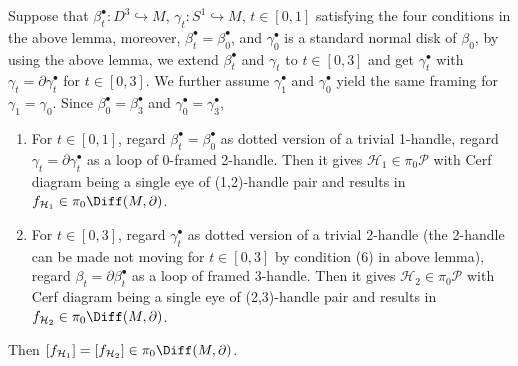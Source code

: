\begin{proposition} \label{prop:one-parameter-version}
    Suppose that $\beta_t^\bullet: D^3\hookrightarrow M$, $\gamma_t: S^1\hookrightarrow M$, $t\in [0,1]$ satisfying the four conditions in the above lemma, moreover, $\beta_t^\bullet=\beta_0^\bullet$, and $\gamma_0^\bullet$ is a standard normal disk of $\beta_0$, by using the above lemma, we extend $\beta_t^\bullet$ and $\gamma_t$ to $t\in[0,3]$ and get $\gamma_t^\bullet$ with $\gamma_t=\partial \gamma_t^\bullet$ for $t\in[0,3]$. We further assume $\gamma_1^\bullet$ and $\gamma_0^\bullet$ yield the same framing for $\gamma_1=\gamma_0$. Since $\beta_0^\bullet=\beta_3^\bullet$ and $\gamma_0^\bullet=\gamma_3^\bullet$, 
    \begin{enumerate}[label=\emph{(\arabic*)}]
        \item For $t\in [0,1]$, regard $\beta_t^\bullet=\beta_0^\bullet$ as dotted version of a trivial 1-handle, regard $\gamma_t=\partial\gamma_t^\bullet$ as a loop of 0-framed 2-handle. Then it gives $\mathcal{H}_1\in \pi_0\mathcal{P}$ with Cerf diagram being a single eye of (1,2)-handle pair and results in $f_{\mathcal{H}_1}\in \pi_0\Diff(M,\partial)$.
        \item For $t\in [0,3]$, regard $\gamma_t^\bullet$ as dotted version of a trivial 2-handle (the 2-handle can be made not moving for $t\in[0,3]$ by condition (6) in above lemma), regard $\beta_t=\partial\beta_t^\bullet$ as a loop of framed 3-handle. Then it gives $\mathcal{H}_2\in \pi_0\mathcal{P}$ with Cerf diagram being a single eye of (2,3)-handle pair and results in $f_{\mathcal{H}_2}\in \pi_0\Diff(M,\partial)$.
    \end{enumerate}
    Then $[f_{\mathcal{H}_1}]=[f_{\mathcal{H}_2}] \in \pi_0\Diff(M,\partial)$.
\end{proposition}

